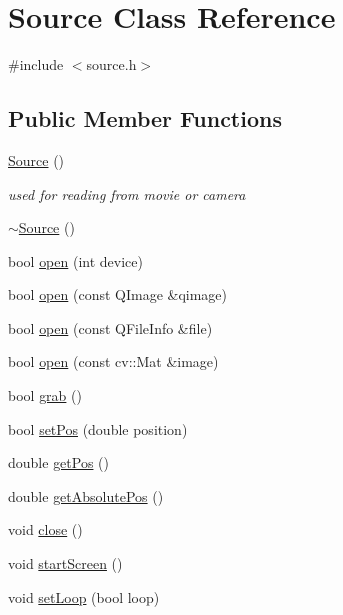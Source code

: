 \hypertarget{class_source}{
\section{Source Class Reference}
\label{class_source}
}


{\ttfamily \#include $<$source.h$>$}

\subsection*{Public Member Functions}
\begin{DoxyCompactItemize}
\item 
\hyperlink{class_source_a660c0a4b8b8f8402568bef86f2cb2fbb}{Source} ()
\begin{DoxyCompactList}\small\item\em used for reading from movie or camera \item\end{DoxyCompactList}\item 
\hyperlink{class_source_ac5104a4d66641ae529419b47da4a1473}{$\sim$Source} ()
\item 
bool \hyperlink{class_source_adc1559efec6c503afc2cc56715179b9c}{open} (int device)
\item 
bool \hyperlink{class_source_a32d55e7dad1e96edf324f07db6431781}{open} (const QImage \&qimage)
\item 
bool \hyperlink{class_source_ab8013e3aac01f5c1e40f568596950689}{open} (const QFileInfo \&file)
\item 
bool \hyperlink{class_source_a99fe00d4c01a089a5f9ede75ca000673}{open} (const cv::Mat \&image)
\item 
bool \hyperlink{class_source_aeb030e2e66c3ca961c56680342f64c0b}{grab} ()
\item 
bool \hyperlink{class_source_a39ec8e95f96c046e92aa1c1e2e8cef4b}{setPos} (double position)
\item 
double \hyperlink{class_source_a67705b9b6a9aa608bca2173438a49506}{getPos} ()
\item 
double \hyperlink{class_source_a6a6551f6d7496d73eaa89bccd11677fe}{getAbsolutePos} ()
\item 
void \hyperlink{class_source_a567c519d7d922f3746d6b6fd9dcf0dec}{close} ()
\item 
void \hyperlink{class_source_ae6fbc6e40dc2d5da14fc5f5e548290db}{startScreen} ()
\item 
void \hyperlink{class_source_a50c48db87dde21ee9fc9ffd70b47b971}{setLoop} (bool loop)
\end{DoxyCompactItemize}
